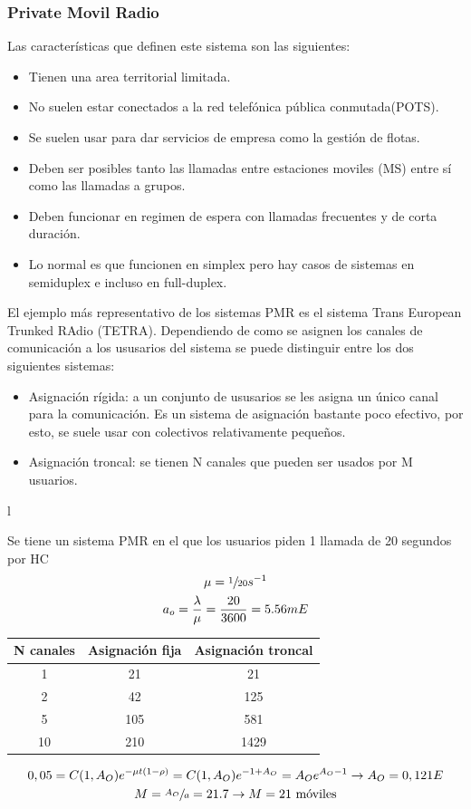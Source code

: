 \subsubsection{Private Movil Radio}
\label{ssub:PMR}
Las características que definen este sistema son las siguientes:
\begin{itemize}
	\item Tienen una area territorial limitada.
	\item No suelen estar conectados a la red telefónica pública conmutada(POTS).
	\item Se suelen usar para dar servicios de empresa como la gestión de flotas.
	\item Deben ser posibles tanto las llamadas entre estaciones moviles (\acrshort{MS}) entre sí como las llamadas a grupos.
	\item Deben funcionar en regimen de espera con llamadas frecuentes y de corta duración.
	\item Lo normal es que funcionen en simplex pero hay casos de sistemas en semiduplex e incluso en full-duplex.
\end{itemize}
El ejemplo más representativo de los sistemas \acrshort{PMR} es el sistema Trans European Trunked RAdio (\acrshort{TETRA}). Dependiendo de como se asignen los canales de comunicación a los ususarios del sistema se puede distinguir entre los dos siguientes sistemas:
\begin{itemize}
	\item Asignación rígida: a un conjunto de ususarios se les asigna un único canal para la comunicación. Es un sistema de asignación bastante poco efectivo, por esto, se suele usar con colectivos relativamente pequeños.
	\item Asignación troncal: se tienen N canales que pueden ser usados por M usuarios.
\end{itemize}
l
\begin{example}
Se tiene un sistema \acrshort{PMR} en el que los usuarios piden 1 llamada de 20 segundos por \acrshort{HC}
\begin{gather*}
	\mu=\sfrac{1}{20}s^{-1}\\
	a_o=\frac{\lambda}{\mu}=\frac{20}{3600}=5.56mE	
\end{gather*}
\begin{center}
\begin{tabular}{|c|c|c|}
\hline
	N canales 	& Asignación fija 	& Asignación troncal \\\hline
	1 			& 21 				& 21 \\\hline
	2 			& 42 				& 125 \\\hline
	5 			& 105 				& 581 \\\hline
	10 			& 210 				& 1429 \\\hline
\end{tabular}
\end{center}
\begin{gather*}
0,05=C(1,A_O)e^{-\mu t(1-\rho)}=C(1,A_O)e^{-1+A_O}=A_Oe^{A_O-1} \to A_O=0,121E\\
M=\sfrac{A_O}{a}=21.7\to M=21\text{ móviles}
\end{gather*}
\end{example}

